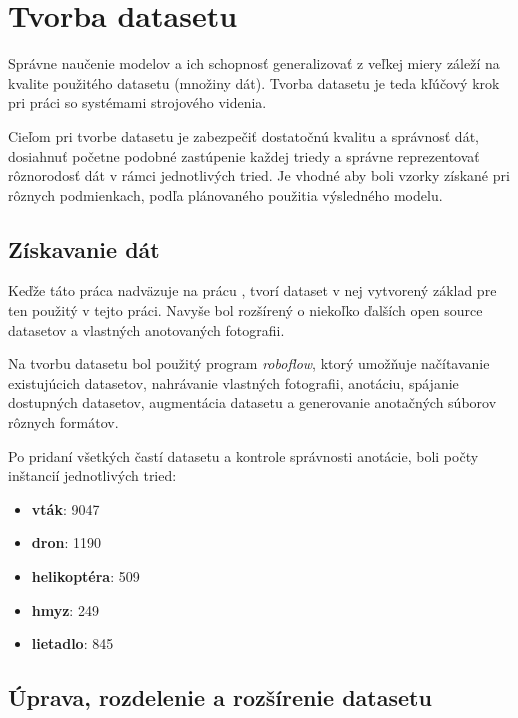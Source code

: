 \chapter{Tvorba datasetu}

    Správne naučenie modelov a ich schopnosť generalizovať z veľkej miery záleží na kvalite použitého datasetu (množiny dát). Tvorba datasetu je teda kľúčový krok pri práci so systémami strojového videnia.

    Cieľom pri tvorbe datasetu je zabezpečiť dostatočnú kvalitu a správnosť dát, dosiahnuť početne podobné zastúpenie každej triedy a správne reprezentovať rôznorodosť dát v rámci jednotlivých tried. Je vhodné aby boli vzorky získané pri rôznych podmienkach, podľa plánovaného použitia výsledného modelu.

    \section{Získavanie dát}

        Keďže táto práca nadväzuje na prácu \cite{Jurecka2021}, tvorí dataset v nej vytvorený základ pre ten použitý v tejto práci. Navyše bol rozšírený o niekoľko ďalších open source datasetov a vlastných anotovaných fotografii.

        Na tvorbu datasetu bol použitý program \emph{roboflow}, ktorý umožňuje načítavanie existujúcich datasetov, nahrávanie vlastných fotografii, anotáciu, spájanie dostupných datasetov, augmentácia datasetu a generovanie anotačných súborov rôznych formátov.

        Po pridaní všetkých častí datasetu a kontrole správnosti anotácie, boli počty inštancií jednotlivých tried:

        \begin{itemize}
            \item \textbf{vták}: 9047
            \item \textbf{dron}: 1190
            \item \textbf{helikoptéra}: 509
            \item \textbf{hmyz}: 249
            \item \textbf{lietadlo}: 845
        \end{itemize}

    \section{Úprava, rozdelenie a rozšírenie datasetu}

